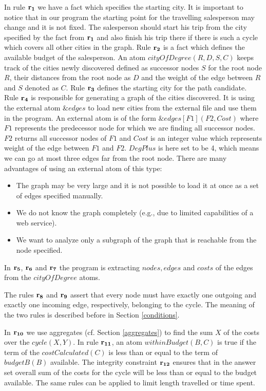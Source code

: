 \documentclass[a4paper, titlepage]{article}
\newcommand{\ext}[3]{\ensuremath{\&{#1}[#2](#3)}}
\newcommand{\row}[1]{%
  \ensuremath{\color{black}\ensuremath{\mathbf{#1}} \color{black}}%
}
\begin{document}
In rule $\row{r_1}$ we have a fact which specifies the starting 
city. 
It is important to notice that in our program the starting 
point for the travelling salesperson may change and it is not 
fixed. The salesperson should start his trip from the 
city specified by the fact from $\row{r_1}$ and also finish 
his trip there if there is such a cycle which covers all 
other cities in the graph. Rule $\row{r_2}$ is a fact which defines the 
available budget of the salesperson. An atom $\mathit{cityOfDegree(R,D,S,C)}$ keeps 
track of the cities newly discovered defined as successor 
nodes $S$ for the root node $R$, their distances from the 
root node as $D$ and the weight of the edge between $R$ and $S$ 
denoted as $C$. Rule $\row{r_3}$ defines the starting city for 
the path candidate. Rule $\row{r_4}$ is responsible for 
generating a graph of 
the cities discovered. It is using the external atom 
$\mathit{\&edges}$ to load new cities from the external 
file and use them in the program. An external atom is of 
the form $\ext{edges}{F1}{F2,Cost}$ where $\mathit{F1}$ 
represents the predecessor node for which we are finding 
all successor 
nodes. $\mathit{F2}$ returns all successor nodes of 
$\mathit{F1}$ and $\mathit{Cost}$ is an integer value which 
represents weight of the edge between $\mathit{F1}$ and 
$\mathit{F2}$. $\mathit{DegPlus}$ is here set to be 4, which means we can go at most three edges far from the root node. 
There are many advantages of using an external atom of this
type:
\begin{itemize}
\item The graph may be very large and it is not possible to load it 
at once as a set of edges specified manually.
\item We do not know the graph completely (e.g., due to limited capabilities of a web service).
\item We want to analyze only a subgraph of the graph that is 
reachable from the node specified.
\end{itemize}    
In $\row{r_5}$, $\row{r_6}$ and $\row{r_7}$ the program is extracting 
$\mathit{nodes}, \mathit{edges}$ and $\mathit{costs}$ of 
the edges from the $\mathit{cityOfDegree}$ atoms. 

The rules $\row{r_8}$ and $\row{r_9}$ assert that every 
node must have exactly one outgoing and exactly one 
incoming edge, respectively, belonging to the cycle. The meaning of the two rules is described before in Section 
\ref{conditions}.

In $\row{r_{10}}$ we use aggregates (cf. Section 
\ref{aggregates}) to find the sum $X$ of the costs over the 
$\mathit{cycle(X,Y)}$. In rule $\row{r_{11}}$, an atom 
$\mathit{withinBudget(B,C)}$ is true if the term of the 
$\mathit{costCalculated(C)}$ is less than or equal to the 
term of $\mathit{budgetB(B)}$ available. The integrity 
constraint $\row{r_{12}}$ ensures that in the answer 
set overall sum of the costs for the cycle will be less 
than or equal to the budget available. The same rules can be applied to limit length travelled or time spent.
\end{document}
